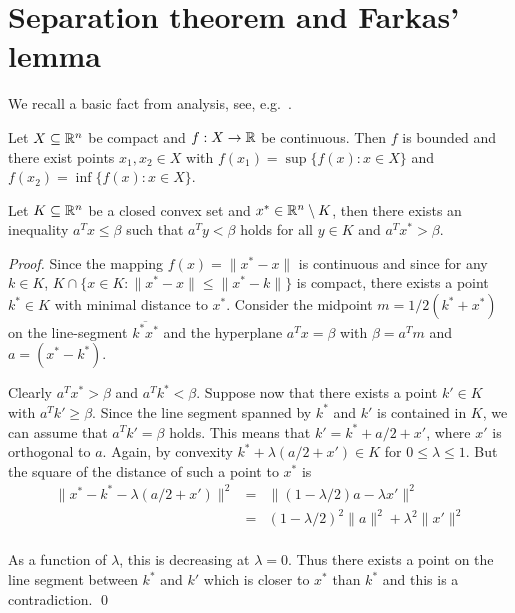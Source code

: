 \section{Separation theorem and Farkas' lemma}
\label{conv:sec:separ-theor-fark}


We recall a basic fact from analysis, see,
e.g.~\cite[Theorem~4.4.1]{MarsdenHoffman93}. 

\begin{theorem}
  \label{conv:thr:11}
  Let $X\subseteq\mathbb{R}^n$ be compact and $f: X \to \mathbb{R}$ be continuous. Then $f$ is
  bounded and there exist
  points $x_1,x_2 \in X$ with $f(x_1) = \sup\{ f(x) \colon  x \in X\}$ and
  $f(x_2) = \inf \{ f(x) \colon x \in X\}$. 
\end{theorem}


\begin{theorem}
  \label{conv:thr:10}
  Let $K\subseteq\mathbb{R}^n$ be a closed  convex set and $x^* \in \mathbb{R}^n \setminus K$, then there
  exists an inequality $a^Tx ≤ \beta$ such that $a^T y < \beta$ holds for all
  $y \in K$ and $a^Tx^*>\beta$. 
\end{theorem}

\begin{proof}
  Since the mapping $f(x) = \|x^*-x\|$ is continuous and since for any
  $k \in K$, $K \cap \{ x \in K \colon \|x^* - x\|\leq \|x^* - k\|\}$ is
  compact, there exists a point $k^* \in K$ with minimal distance to
  $x^*$. Consider the midpoint $m = 1/2(k^*+x^*)$ on the line-segment
  $\overline{k^*x^*}$   and the hyperplane $a^Tx = \beta$ with $\beta = a^Tm$ and $a =
  (x^* - k^*)$.%

  Clearly $a^T x^* > β$ and $a^T k^* < β$. Suppose now that there exists a point $k' ∈ K$ with $a^T k' ≥ β$. Since the line segment spanned by $k^*$ and $k'$ is contained in $K$, we can assume that $a^T k' = β$ holds. This means that $k' = k^* + a/2 + x'$, where $x'$ is orthogonal to $a$. Again, by convexity $ k^* + λ(a/2 + x') ∈ K$ for $0≤λ≤1$. But the square of the distance of such a point to $x^*$ is 
  \begin{eqnarray*}
    \|x^* - k^* - λ(a/2 + x')\|^2 & = & \|(1-λ/2) a - λ x'\|^2 \\
    & = & (1-λ/2)^2 \| a\|^2  + λ^2  \|x'\|^2 \\ 
  \end{eqnarray*}
  
  As a function of $\lambda$, this is decreasing 
  at $\lambda=0$. Thus there exists a point on the line segment between $k^*$ and $k'$ which is closer to $x^*$ than $k^*$ and this is a contradiction. 
  \qed 
\end{proof}


